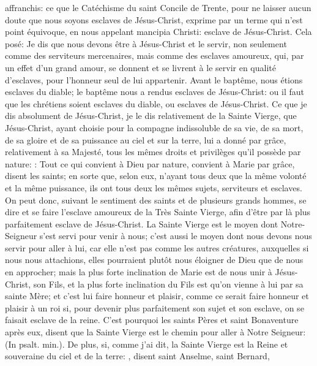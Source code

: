 affranchis: ce que le Catéchisme du saint Concile de Trente, pour ne laisser aucun doute que nous soyons
esclaves de Jésus-Christ, exprime par un terme qui n'est point équivoque, en nous appelant mancipia Christi:
esclave de Jésus-Christ. Cela posé:
 Je dis que nous devons être à Jésus-Christ et le servir, non seulement comme des serviteurs mercenaires,
mais comme des esclaves amoureux, qui, par un effet d'un grand amour, se donnent et se livrent à le servir en
qualité d'esclaves, pour l'honneur seul de lui appartenir. Avant le baptême, nous étions esclaves du diable; le
baptême nous a rendus esclaves de Jésus-Christ: ou il faut que les chrétiens soient esclaves du diable, ou
esclaves de Jésus-Christ.
 Ce que je dis absolument de Jésus-Christ, je le dis relativement de la Sainte Vierge, que Jésus-Christ, ayant
choisie pour la compagne indissoluble de sa vie, de sa mort, de sa gloire et de sa puissance au ciel et sur la terre,
lui a donné par grâce, relativement à sa Majesté, tous les mêmes droits et privilèges qu'il possède par nature:
: Tout ce qui convient à Dieu par nature, convient
à Marie par grâce, disent les saints; en sorte que, selon eux, n'ayant tous deux que la même volonté et la même
puissance, ils ont tous deux les mêmes sujets, serviteurs et esclaves.
 On peut donc, suivant le sentiment des saints et de plusieurs grands hommes, se dire et se faire l'esclave
amoureux de la Très Sainte Vierge, afin d'être par là plus parfaitement esclave de Jésus-Christ. La Sainte Vierge
est le moyen dont Notre-Seigneur s'est servi pour venir à nous; c'est aussi le moyen dont nous devons nous servir
pour aller à lui, car elle n'est pas comme les autres créatures, auxquelles si nous nous attachions, elles pourraient
plutôt nous éloigner de Dieu que de nous en approcher; mais la plus forte inclination de Marie est de nous unir à
Jésus-Christ, son Fils, et la plus forte inclination du Fils est qu'on vienne à lui par sa sainte Mère; et c'est lui faire
honneur et plaisir, comme ce serait faire honneur et plaisir à un roi si, pour devenir plus parfaitement son sujet et
son esclave, on se faisait esclave de la reine. C'est pourquoi les saints Pères et saint Bonaventure après eux,
disent que la Sainte Vierge est le chemin pour aller à Notre Seigneur:  (In psalt. min.).
 De plus, si, comme j'ai dit, la Sainte Vierge est la Reine et souveraine du ciel et de la terre: , disent saint Anselme, saint Bernard,
